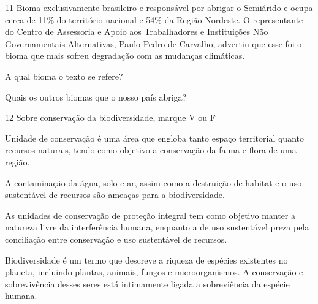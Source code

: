 {{\num{11}  Bioma exclusivamente brasileiro e responsável por abrigar o Semiárido
  e ocupa cerca de 11\% do território nacional e 54\% da Região
  Nordeste. O representante do Centro de Assessoria e Apoio aos
  Trabalhadores e Instituições Não Governamentais Alternativas, Paulo
  Pedro de Carvalho, advertiu que esse foi o bioma que mais sofreu
  degradação com as mudanças climáticas.


\begin{escolha}
\item A qual bioma o texto se refere?



\item Quais os outros biomas que o nosso país abriga?


\end{escolha}

\num{12}  Sobre conservação da biodiversidade, marque V ou F

\begin{boxlist}
\item Unidade de conservação é uma área que engloba tanto espaço
territorial quanto recursos naturais, tendo como objetivo a conservação
da fauna e flora de uma região. 

\item A contaminação da água, solo e ar, assim como a destruição de
habitat e o uso sustentável de recursos são ameaças para a
biodiversidade. 

\item As unidades de conservação de proteção integral tem como objetivo
manter a natureza livre da interferência humana, enquanto a de uso
sustentável preza pela conciliação entre conservação e uso sustentável
de recursos. 

\item Biodiversidade é um termo que descreve a riqueza de espécies
existentes no planeta, incluindo plantas, animais, fungos e
microorganismos. A conservação e sobrevivência desses seres está
intimamente ligada a sobreviência da espécie humana. 
\end{boxlist}

}}
